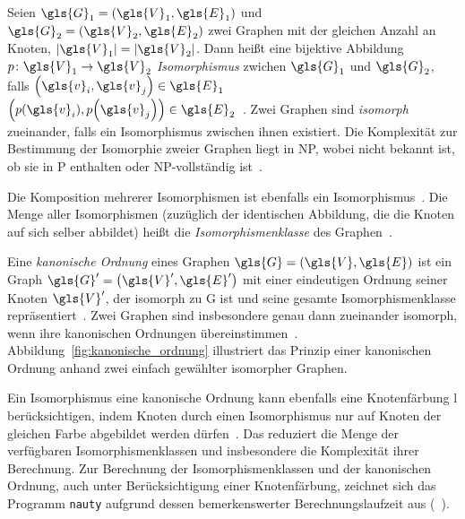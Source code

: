 Seien $\gls{G}_1 = \left(\gls{V}_1, \gls{E}_1\right)$ und $\gls{G}_2 = \left(\gls{V}_2, \gls{E}_2\right)$ zwei Graphen mit der gleichen Anzahl an Knoten, \dhe{} $\left|\gls{V}_1\right| = \left|\gls{V}_2\right|$.
Dann heißt eine bijektive Abbildung $p \colon \gls{V}_1 \to \gls{V}_2$ \emph{Isomorphismus} zwichen $\gls{G}_1$ und $\gls{G}_2$, falls $\left(\gls{v}_i, \gls{v}_j\right) \in \gls{E}_1$ \gdw{} $\left(p\left(\gls{v}_i\right), p\left(\gls{v}_j\right)\right) \in \gls{E}_2$~\cite{nauty}.
Zwei Graphen sind \emph{isomorph} zueinander, falls ein Isomorphismus zwischen ihnen existiert.
Die Komplexität zur Bestimmung der Isomorphie zweier Graphen liegt in NP, wobei nicht bekannt ist, ob sie in P enthalten oder NP-vollständig ist~\cite{patchy}.

Die Komposition mehrerer Isomorphismen ist ebenfalls ein Isomorphismus~\cite{nauty}.
Die Menge aller Isomorphismen (zuzüglich der identischen Abbildung, die die Knoten auf sich selber abbildet) heißt die \emph{Isomorphismenklasse} des Graphen~\cite{nauty}.

Eine \emph{kanonische Ordnung} eines Graphen $\gls{G} = \left(\gls{V}, \gls{E}\right)$ ist ein Graph $\gls{G}^{\prime} = \left(\gls{V}^{\prime}, \gls{E}^{\prime}\right)$ mit einer eindeutigen Ordnung seiner Knoten $\gls{V}^{\prime}$, der isomorph zu \gls{G} ist und seine gesamte Isomorphismenklasse repräsentiert~\cite{patchy}.
Zwei Graphen sind insbesondere genau dann zueinander isomorph, wenn ihre kanonischen Ordnungen übereinstimmen~\cite{nauty}.
Abbildung~\ref{fig:kanonische_ordnung} illustriert das Prinzip einer kanonischen Ordnung anhand zwei einfach gewählter isomorpher Graphen.


Ein Isomorphismus \bzw{} eine kanonische Ordnung kann ebenfalls eine Knotenfärbung \gls{l} berücksichtigen, indem Knoten durch einen Isomorphismus nur auf Knoten der gleichen Farbe abgebildet werden dürfen~\cite{nauty}.
Das reduziert die Menge der verfügbaren Isomorphismenklassen und insbesondere die Komplexität ihrer Berechnung.
Zur Berechnung der Isomorphismenklassen und der kanonischen Ordnung, auch unter Berücksichtigung einer Knotenfärbung, zeichnet sich das Programm \texttt{nauty} aufgrund dessen bemerkenswerter Berechnungslaufzeit aus (\vgl{}~\cite{nauty}).
